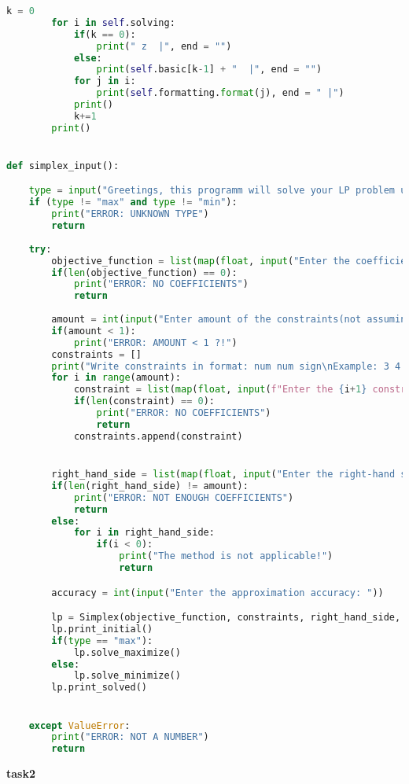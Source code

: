 \documentclass[12pt, legalpaper]{exam}
\begin{document}
\begin{lstlisting}[language=Python, caption=Программа на Python, label=lst:python-code]
        k = 0
        for i in self.solving:
            if(k == 0):
                print(" z  |", end = "")
            else:
                print(self.basic[k-1] + "  |", end = "")
            for j in i:
                print(self.formatting.format(j), end = " |")
            print()
            k+=1
        print()


def simplex_input():

    type = input("Greetings, this programm will solve your LP problem using Simplex method.\nEnter the type of the problem(Max/Min): ").lower()
    if (type != "max" and type != "min"):
        print("ERROR: UNKNOWN TYPE")
        return
    
    try:
        objective_function = list(map(float, input("Enter the coefficients of the objective function: ").split(" ")))
        if(len(objective_function) == 0):
            print("ERROR: NO COEFFICIENTS")
            return
        
        amount = int(input("Enter amount of the constraints(not assuming x>=0): "))
        if(amount < 1):
            print("ERROR: AMOUNT < 1 ?!")
        constraints = []
        print("Write constraints in format: num num sign\nExample: 3 4 <=")
        for i in range(amount):
            constraint = list(map(float, input(f"Enter the {i+1} constraint function coefficients: ").split(" ")))
            if(len(constraint) == 0):
                print("ERROR: NO COEFFICIENTS")
                return
            constraints.append(constraint)


        right_hand_side = list(map(float, input("Enter the right-hand side numbers: ").split(" ")))
        if(len(right_hand_side) != amount):
            print("ERROR: NOT ENOUGH COEFFICIENTS")
            return
        else:
            for i in right_hand_side:
                if(i < 0):
                    print("The method is not applicable!")
                    return

        accuracy = int(input("Enter the approximation accuracy: "))

        lp = Simplex(objective_function, constraints, right_hand_side, accuracy)
        lp.print_initial()
        if(type == "max"):
            lp.solve_maximize()
        else:
            lp.solve_minimize()
        lp.print_solved()


    except ValueError:
        print("ERROR: NOT A NUMBER")
        return
\end{lstlisting}

\textbf{task2}
\end{document}
